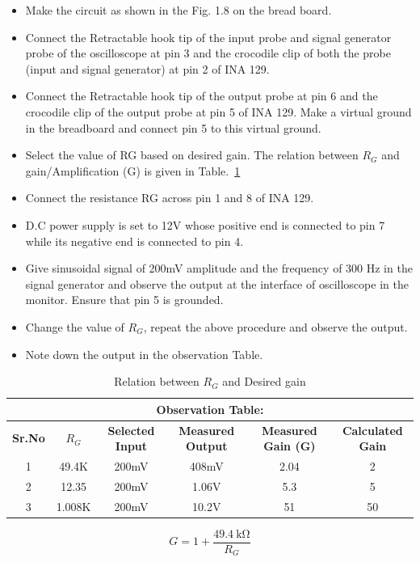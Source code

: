 \documentclass[9pt]{scrreprt}
\begin{document}
\begin{itemize}
\item Make the circuit as shown in the Fig. 1.8 on the bread board.
\item Connect the Retractable hook tip of the input probe and signal generator probe of the oscilloscope at pin 3 and the crocodile clip of both the probe (input and signal generator) at pin 2 of INA 129.
\item Connect the Retractable hook tip of the output probe at pin 6 and the crocodile clip of the output probe at pin 5 of INA 129. Make a virtual ground in the breadboard and connect pin 5 to this virtual ground.
\item Select the value of RG based on desired gain. The relation between $R_G$ and gain/Amplification (G) is given in Table.~\ref{tab:Rc and gain}
\item Connect the resistance RG across pin 1 and 8 of INA 129.
\item D.C power supply is set to 12V whose positive end is connected to pin 7 while its negative end is connected to pin 4.
\item Give sinusoidal signal of 200mV amplitude and the frequency of 300 Hz in the signal generator and observe the output at the interface of oscilloscope in the monitor. Ensure that pin 5 is grounded.
\item Change the value of $R_G$, repeat the above procedure and observe the output.
\item Note down the output in the observation Table.
\end{itemize}

\begin{table}[h!]
\centering
\begin{tabular}{|c|c|c|c|c|c|}
\hline
\multicolumn{6}{|c|}{\textbf{Observation Table:}} \\ \hline
\textbf{Sr.No} & \textbf{$R_G$} & \textbf{Selected Input} & \textbf{Measured Output} & \textbf{Measured Gain (G)} & \textbf{Calculated Gain} \\ \hline
1 & 49.4K & 200mV & 408mV & 2.04 & 2 \\ \hline
2 & 12.35 & 200mV & 1.06V & 5.3 & 5 \\ \hline
3 & 1.008K & 200mV & 10.2V & 51 & 50 \\ \hline
\end{tabular}
\caption{Relation between $R_G$ and Desired gain}
\label{tab:Rc and gain}
\end{table}

\begin{equation*}
    G = 1 + \frac{\SI{49.4}{\kilo\ohm}}{R_G}
\end{equation*}
\end{document}
